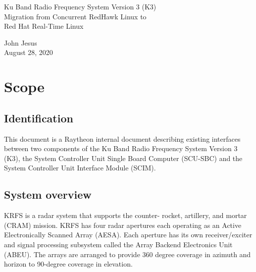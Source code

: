 \documentclass[12pt]{article}
\begin{document}
\thispagestyle{empty}
\begin{titlepage}
\begin{center}
        \vspace*{1cm}

        \LARGE{Ku Band Radio Frequency System Version 3 (K3) \\
        Migration from Concurrent RedHawk Linux to \\
        Red Hat Real-Time Linux}

        \vspace{0.5cm}
        \LARGE

        \vspace{1.5cm}

        \normalsize

        John Jesus \\
        August 28, 2020

        \vfill



        \vspace{0.8cm}




\end{center}
\end{titlepage}

\tableofcontents
\newpage

\section{Scope}
\subsection{Identification}
This document is a Raytheon internal document describing existing interfaces
between two components of the Ku Band Radio Frequency System Version 3 (K3), the
System Controller Unit Single Board Computer (SCU-SBC) and the System Controller
Unit Interface Module (SCIM).

\subsection{System overview}
KRFS is a radar system that supports the counter- rocket, artillery, and mortar (CRAM) mission.
KRFS has four radar apertures each operating as an Active Electronically
Scanned Array (AESA).  Each aperture has its own receiver/exciter and signal processing
subsystem called the Array Backend Electronics Unit (ABEU).  The arrays are arranged to
provide 360 degree coverage in azimuth and horizon to 90-degree coverage in elevation.
\end{document}
